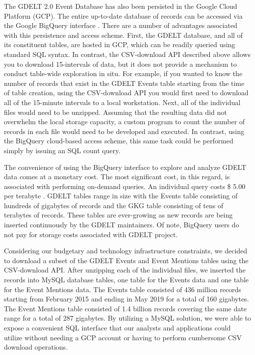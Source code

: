 \documentclass[preprint,authoryear,12pt]{elsarticle/elsarticle}
\begin{document}
The GDELT 2.0 Event Database has also been persisted in the Google Cloud Platform (GCP). The entire up-to-date database of records can be accessed via the Google BigQuery interface \citep{GDELTBIGQUERY}. There are a number of advantages associated with this persistence and access scheme. First, the GDELT database, and all of its constituent tables, are hosted in GCP, which can be readily queried using standard SQL syntax. In contrast, the CSV-download API described above allows you to download 15-intervals of data, but it does not provide a mechanism to conduct table-wide exploration in situ. For example, if you wanted to know the number of records that exist in the GDELT Events table starting from the time of table creation, using the CSV-download API you would first need to download all of the 15-minute intervals to a local workstation. Next, all of the individual files would need to be unzipped. Assuming that the resulting data did not overwhelm the local storage capacity, a custom program to count the number of records in each file would need to be developed and executed. In contrast, using the BigQuery cloud-based access scheme, this same task could be performed simply by issuing an SQL count query. 

The convenience of using the BigQuery interface to explore and analyze GDELT data comes at a monetary cost. The most significant cost, in this regard, is associated with performing on-demand queries. An individual query costs \$ 5.00 per terabyte \cite{BIGQUERYPRICE}. GDELT tables range in size with the Events table consisting of hundreds of gigabytes of records and the GKG table consisting of tens of terabytes of records. These tables are ever-growing as new records are being inserted continuously by the GDELT maintainers. Of note, BigQuery users do not pay for storage costs associated with GDELT project.    

Considering our budgetary and technology infrastructure constraints, we decided to download a subset of the GDELT Events and Event Mentions tables using the CSV-download API. After unzipping each of the individual files, we inserted the records into MySQL database tables, one table for the Events data and one table for the Event Mentions data. The Events table consisted of 436 million records starting from February 2015 and ending in May 2019 for a total of 160 gigabytes. The Event Mentions table consisted of 1.4 billion records covering the same date range for a total of 287 gigabytes. By utilizing a MySQL solution, we were able to expose a convenient SQL interface that our analysts and applications could utilize without needing a GCP account or having to perform cumbersome CSV download operations. 
\end{document}
